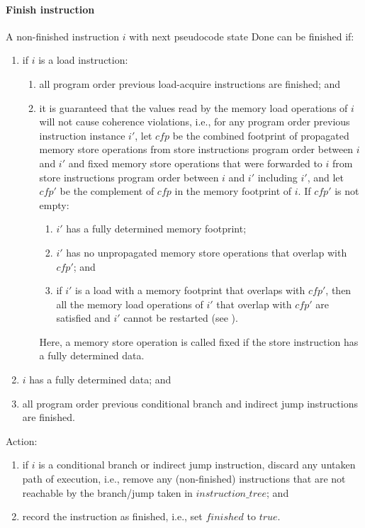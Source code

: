 \paragraph{Finish instruction}\label{omm:hart:finish}
A non-finished instruction $i$ with next pseudocode state {\sc Done} can be finished if:
\begin{enumerate}
\item if $i$ is a load instruction:
  \begin{enumerate}
  \item all program order previous load-acquire instructions are finished; and
  \item it is guaranteed that the values read by the memory load operations of $i$ will not cause coherence violations, i.e., for any program order previous instruction instance $i'$, let $cfp$ be the combined footprint of propagated memory store operations from store instructions program order between $i$ and $i'$ and fixed memory store operations that were forwarded to $i$ from store instructions program order between $i$ and $i'$ including $i'$, and let $cfp'$ be the complement of $cfp$ in the memory footprint of $i$.
  If $cfp'$ is not empty:
    \begin{enumerate}
    \item $i'$ has a fully determined memory footprint;
    \item $i'$ has no unpropagated memory store operations that overlap with $cfp'$; and
    \item if $i'$ is a load with a memory footprint that overlaps with $cfp'$, then all the memory load operations of $i'$ that overlap with $cfp'$ are satisfied and $i'$ cannot be restarted (see ).
    \end{enumerate}
  Here, a memory store operation is called fixed if the store instruction has a fully determined data.
  \end{enumerate}
\item $i$ has a fully determined data; and
\item all program order previous conditional branch and indirect jump instructions are finished.
\end{enumerate}
Action:
\begin{enumerate}
\item if $i$ is a conditional branch or indirect jump instruction, discard any untaken path of execution, i.e., remove any (non-finished) instructions that are not reachable by the branch/jump taken in $instruction\_tree$; and
\item record the instruction as finished, i.e., set $finished$ to $true$.
\end{enumerate}


